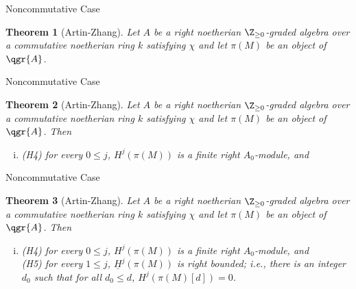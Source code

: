 \documentclass{beamer}
\newtheorem{thm}{Theorem}
\theoremstyle{definition}
\begin{document}
\begin{frame}{Noncommutative Case}
  \setcounter{thm}{1}
  \begin{thm}[Artin-Zhang]
    Let $A$ be a right noetherian $\Z_{\geq 0}$-graded algebra over a commutative noetherian ring $k$ satisfying $\chi$ and let $\pi(M)$ be an object of $\qgr{A}$.
  \end{thm}
\end{frame}

\begin{frame}{Noncommutative Case}
  \setcounter{thm}{1}
  \begin{thm}[Artin-Zhang]
          Let $A$ be a right noetherian $\Z_{\geq 0}$-graded algebra over a commutative noetherian ring $k$ satisfying $\chi$ and let $\pi(M)$ be an object of $\qgr{A}$.
      Then
    \begin{enumerate}[(i)]
    \item
      \begin{center}
        \begin{flushleft}
          (H4) for every $0 \leq j$, $H^j(\pi(M))$ is a finite right $A_0$-module, and\\
        \end{flushleft}
      \end{center}
    \end{enumerate}
  \end{thm}
\end{frame}

\begin{frame}{Noncommutative Case}
  \setcounter{thm}{1}
  \begin{thm}[Artin-Zhang]
          Let $A$ be a right noetherian $\Z_{\geq 0}$-graded algebra over a commutative noetherian ring $k$ satisfying $\chi$ and let $\pi(M)$ be an object of $\qgr{A}$.
      Then
    \begin{enumerate}[(i)]
    \item
      \begin{center}
        \begin{flushleft}
          (H4) for every $0 \leq j$, $H^j(\pi(M))$ is a finite right $A_0$-module, and\\
          (H5) for every $1 \leq j$, $\underline{H}^j(\pi(M))$ is right bounded; i.e., there is an integer $d_0$ such that for all $d_0 \leq d$, $H^{j}(\pi(M)[d]) = 0$.
        \end{flushleft}
      \end{center}
    \end{enumerate}
  \end{thm}
\end{frame}
\end{document}

